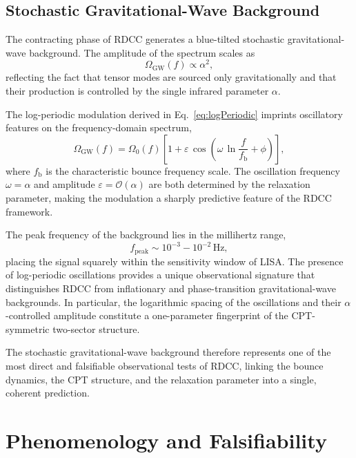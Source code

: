 \documentclass[11pt,a4paper]{article}
\begin{document}
\subsection{Stochastic Gravitational-Wave Background}

The contracting phase of RDCC generates a blue-tilted stochastic
gravitational-wave background. The amplitude of the spectrum scales as
\begin{equation}
    \Omega_{\mathrm{GW}}(f) \propto \alpha^{2},
\end{equation}
reflecting the fact that tensor modes are sourced only gravitationally and that
their production is controlled by the single infrared parameter \(\alpha\).

The log-periodic modulation derived in Eq.~\eqref{eq:logPeriodic} imprints
oscillatory features on the frequency-domain spectrum,
\begin{equation}
    \Omega_{\mathrm{GW}}(f)
    = \Omega_{0}(f)\left[
        1
        + \varepsilon\,
          \cos\!\left(
              \omega\,\ln\!\frac{f}{f_{\mathrm{b}}}
              + \phi
          \right)
    \right],
\end{equation}
where \(f_{\mathrm{b}}\) is the characteristic bounce frequency scale. The
oscillation frequency \(\omega = \alpha\) and amplitude \(\varepsilon =
\mathcal{O}(\alpha)\) are both determined by the relaxation parameter, making
the modulation a sharply predictive feature of the RDCC framework.

The peak frequency of the background lies in the millihertz range,
\begin{equation}
    f_{\mathrm{peak}}
    \sim 10^{-3} - 10^{-2}\,\mathrm{Hz},
\end{equation}
placing the signal squarely within the sensitivity window of LISA. The presence
of log-periodic oscillations provides a unique observational signature that
distinguishes RDCC from inflationary and phase-transition gravitational-wave
backgrounds. In particular, the logarithmic spacing of the oscillations and
their \(\alpha\)-controlled amplitude constitute a one-parameter fingerprint of
the CPT-symmetric two-sector structure.

The stochastic gravitational-wave background therefore represents one of the
most direct and falsifiable observational tests of RDCC, linking the bounce
dynamics, the CPT structure, and the relaxation parameter into a single,
coherent prediction.

\clearpage

\section{Phenomenology and Falsifiability}
\label{sec:phenomenology}
\end{document}
